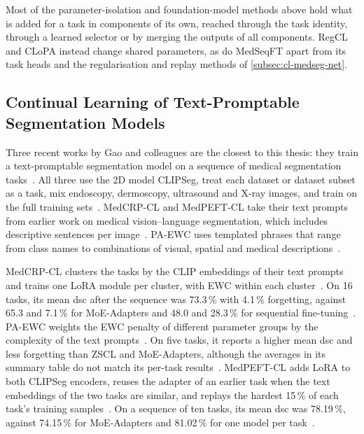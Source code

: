 Most of the parameter-isolation and foundation-model methods above hold what is added for a task in components of its own, reached through the task identity, through a learned selector or by merging the outputs of all components.
RegCL and CLoPA instead change shared parameters, as do MedSeqFT apart from its task heads and the regularisation and replay methods of \cref{subsec:cl-medseg-net}.

\subsection{Continual Learning of Text-Promptable Segmentation Models}
\label{subsec:cl-medseg-text}

Three recent works by Gao and colleagues are the closest to this thesis: they train a text-promptable segmentation model on a sequence of medical segmentation tasks~\cite{gao2026medcrpcl,gao2025paewc,gao2026medpeftcl}.
All three use the 2D model CLIPSeg, treat each dataset or dataset subset as a task, mix endoscopy, dermoscopy, ultrasound and X-ray images, and train on the full training sets~\cite{gao2026medcrpcl,gao2025paewc,gao2026medpeftcl}.
MedCRP-CL and MedPEFT-CL take their text prompts from earlier work on medical vision--language segmentation, which includes descriptive sentences per image~\cite{gao2026medcrpcl,gao2026medpeftcl}.
PA-EWC uses templated phrases that range from class names to combinations of visual, spatial and medical descriptions~\cite{gao2025paewc}.

MedCRP-CL clusters the tasks by the CLIP embeddings of their text prompts and trains one LoRA module per cluster, with EWC within each cluster~\cite{gao2026medcrpcl}.
On 16 tasks, its mean \gls{dsc} after the sequence was 73.3\,\% with 4.1\,\% forgetting, against 65.3 and 7.1\,\% for MoE-Adapters and 48.0 and 28.3\,\% for sequential fine-tuning~\cite{gao2026medcrpcl}.
PA-EWC weights the EWC penalty of different parameter groups by the complexity of the text prompts~\cite{gao2025paewc}.
On five tasks, it reports a higher mean \gls{dsc} and less forgetting than ZSCL and MoE-Adapters, although the averages in its summary table do not match its per-task results~\cite{gao2025paewc}.
MedPEFT-CL adds LoRA to both CLIPSeg encoders, reuses the adapter of an earlier task when the text embeddings of the two tasks are similar, and replays the hardest 15\,\% of each task's training samples~\cite{gao2026medpeftcl}.
On a sequence of ten tasks, its mean \gls{dsc} was 78.19\,\%, against 74.15\,\% for MoE-Adapters and 81.02\,\% for one model per task~\cite{gao2026medpeftcl}.

